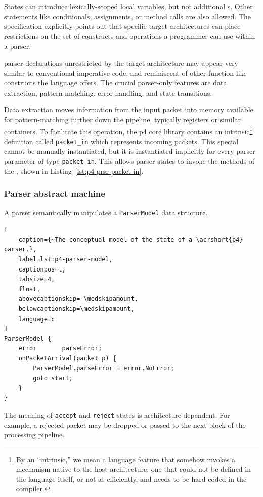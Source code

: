 States can introduce lexically-scoped local variables, but not additional
\extern{}s. Other statements like conditionals, assignments, or method calls are
also allowed. The specification explicitly points out that specific target
architectures can place restrictions on the set of constructs and operations a
programmer can use within a parser.

\pfs parser declarations unrestricted by the target architecture may appear very
similar to conventional imperative code, and reminiscent of other function-like
constructs the language offers. The crucial parser-only features are data
extraction, pattern-matching, error handling, and state transitions.

Data extraction moves information from the input packet into memory available
for pattern-matching further down the pipeline, typically registers or similar
containers. To facilitate this operation, the \acrshort{p4} core library
contains an intrinsic\footnote{By an ``intrinsic,'' we mean a language feature
that somehow invokes a mechanism native to the host architecture, one that could
not be defined in the language itself, or not as efficiently, and needs to be
hard-coded in the compiler.} \extern{} definition called \texttt{packet\_in}
which represents incoming packets. This special \extern{} cannot be manually
instantiated, but it is instantiated implicitly for every parser parameter of
type \texttt{packet\_in}. This allows parser states to invoke the methods of the
\extern{}, shown in Listing~\ref{lst:p4-prsr-packet-in}.

\subsubsection*{Parser abstract machine}

A parser semantically manipulates a \texttt{ParserModel} data structure.

\begin{lstlisting}[
	caption={~The conceptual model of the state of a \acrshort{p4} parser.},
	label=lst:p4-parser-model,
	captionpos=t,
	tabsize=4,
	float,
	abovecaptionskip=-\medskipamount,
	belowcaptionskip=\medskipamount,
	language=c
]
ParserModel {
	error       parseError;
	onPacketArrival(packet p) {
		ParserModel.parseError = error.NoError;
		goto start;
	}
}
\end{lstlisting}

The meaning of \texttt{accept} and \texttt{reject} states is
architecture-dependent. For example, a rejected packet may be dropped or
passed to the next block of the processing pipeline.


